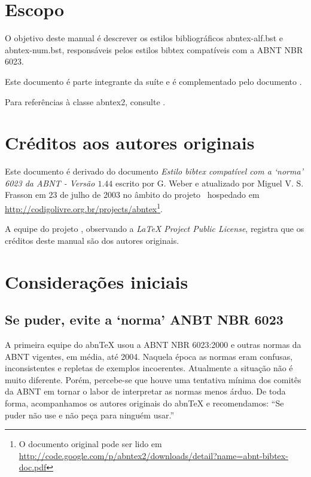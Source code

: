 \documentclass[a4paper]{ltxdoc}
\begin{document}
\tableofcontents
\listoftables

\section{Escopo}

O objetivo deste manual é descrever os estilos bibliográficos
\textsf{abntex-alf.bst} e \textsf{abntex-num.bst}, responsáveis pelos estilos
\textsf{bibtex} compatíveis com a ABNT NBR 6023. 

Este documento é parte integrante da suíte  e é complementado pelo
documento .

Para referências à classe \textsf{abntex2}, consulte .


\section{Créditos aos autores originais}

Este documento é derivado do documento \emph{Estilo bibtex compatível com a
`norma' 6023 da ABNT - Versão $ 1.44 $} escrito por G. Weber e atualizado por
Miguel V. S. Frasson em 23 de julho de 2003 no âmbito do projeto \abnTeX\
hospedado em \url{http://codigolivre.org.br/projects/abntex}\footnote{O documento original
pode ser lido em
\url{http://code.google.com/p/abntex2/downloads/detail?name=abnt-bibtex-doc.pdf}}.

A equipe do projeto , observando a \emph{LaTeX Project Public License},
registra que os créditos deste manual são dos autores originais.

\section{Considerações iniciais}

\subsection{Se puder, evite a `norma' ANBT NBR 6023}

A primeira equipe do abnTeX usou a ABNT NBR 6023:2000 e outras normas da ABNT
vigentes, em média, até 2004. Naquela época as normas eram confusas,
inconsistentes e repletas de exemplos incoerentes. Atualmente a situação não é
muito diferente. Porém, percebe-se que houve uma tentativa mínima dos comitês da
ABNT em tornar o labor de interpretar as normas menos árduo. De toda forma,
acompanhamos os autores originais do abnTeX e recomendamos: ``Se puder não use e
não peça para ninguém usar.''
\end{document}
